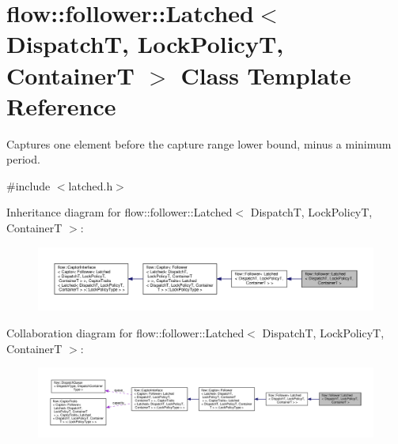 \hypertarget{classflow_1_1follower_1_1_latched}{}\section{flow\+:\+:follower\+:\+:Latched$<$ DispatchT, Lock\+PolicyT, ContainerT $>$ Class Template Reference}
\label{classflow_1_1follower_1_1_latched}


Captures one element before the capture range lower bound, minus a minimum period.  




{\ttfamily \#include $<$latched.\+h$>$}



Inheritance diagram for flow\+:\+:follower\+:\+:Latched$<$ DispatchT, Lock\+PolicyT, ContainerT $>$\+:\nopagebreak
\begin{figure}[H]
\begin{center}
\leavevmode
\includegraphics[width=350pt]{classflow_1_1follower_1_1_latched__inherit__graph}
\end{center}
\end{figure}


Collaboration diagram for flow\+:\+:follower\+:\+:Latched$<$ DispatchT, Lock\+PolicyT, ContainerT $>$\+:\nopagebreak
\begin{figure}[H]
\begin{center}
\leavevmode
\includegraphics[width=350pt]{classflow_1_1follower_1_1_latched__coll__graph}
\end{center}
\end{figure}
